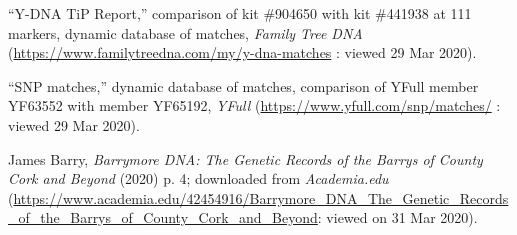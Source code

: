 \begin{thebibliography}{999}
``Y-DNA TiP Report,'' comparison of kit \#904650 with kit \#441938 at 111 markers, dynamic database of matches, \textit{Family Tree DNA} (\url{https://www.familytreedna.com/my/y-dna-matches} : viewed 29 Mar 2020).

``SNP matches,'' dynamic database of matches, comparison of YFull member YF63552 with member YF65192, \textit{YFull} (\url{https://www.yfull.com/snp/matches/} : viewed 29 Mar 2020).

James Barry, \textit{Barrymore DNA: The Genetic Records of the Barrys of County Cork and Beyond} (2020) p. 4; downloaded from \textit{Academia.edu} (\url{https://www.academia.edu/42454916/Barrymore_DNA_The_Genetic_Records_of_the_Barrys_of_County_Cork_and_Beyond}: viewed on 31 Mar 2020).

\end{thebibliography}